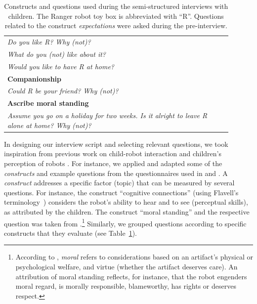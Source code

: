 \documentclass{sig-alternate}
\begin{document}
\begin{table}[h!t]
\begin{tabular}{p{0.9\linewidth}}
    \emph{Do you like R? Why (not)?} \\
    \emph{What do you (not) like about it?} \\
    \emph{Would you like to have R at home?} \\

    \toprule
    \textbf{Companionship} \\
    \midrule


    \emph{Could R be your friend? Why (not)?}\\

    \toprule
    \textbf{Ascribe moral standing} \\
    \midrule


    \emph{Assume you go on a holiday for two weeks. Is it alright to leave R
    alone at home? Why (not)?} \\

    \bottomrule

\end{tabular}

    \caption{\small Constructs and questions used during the semi-structured interviews
    with children. The Ranger robot toy box is abbreviated with ``R''. Questions
    related to the construct \emph{expectations} were asked during the
    pre-interview.}

    \label{tab:domino-questions} 

\end{table}


In designing our interview script and selecting relevant questions, we took
inspiration from previous work on child-robot interaction and children's
perception of robots
\cite{kahn_jr._robotic_2006,weiss_i_2009,leite_influence_2013}. For instance, we
applied and adapted some of the \emph{constructs} and example questions from the
questionnaires used in \cite{kahn_jr._robotic_2006} and \cite{weiss_i_2009}. A
\emph{construct} addresses a specific factor (topic) that can be measured by
several questions. For instance, the construct ``cognitive connections'' (using
Flavell's terminology~\cite{flavell1988development}) considers the robot's
ability to hear and to see (perceptual skills), as attributed by the children.
The construct ``moral standing'' and the respective question was taken from
\cite{kahn_jr._robotic_2006}.\footnote{According to
\cite{kahn_jr._robotic_2006}, \textit{moral} refers to considerations based
on an artifact's physical or psychological welfare, and virtue (whether the
artifact deserves care). An attribution of moral standing reflects, for
instance, that the robot engenders moral regard, is morally responsible,
blameworthy, has rights or deserves respect.}			Similarly, we grouped
questions according to specific constructs that they evaluate (see
Table~\ref{tab:domino-questions}).
\end{document}
